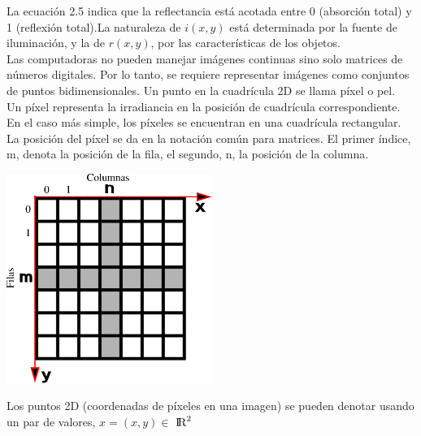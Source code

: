 La ecuación 2.5 indica que la reflectancia está acotada entre 0 (absorción total) y
1 (reflexión total).La naturaleza de $i(x,y)$ está determinada por la fuente de iluminación, y la de $r(x,y)$, por
las características de los objetos.\\
Las computadoras no pueden manejar imágenes continuas sino solo matrices de números digitales. Por lo tanto, se 
requiere representar imágenes como conjuntos de puntos bidimensionales. Un punto en la cuadrícula 2D se llama píxel o pel.\\
Un píxel representa la irradiancia en la posición de cuadrícula correspondiente. En el caso más simple, los píxeles se encuentran 
en una cuadrícula rectangular. La posición del píxel se da en la notación común para matrices.
El primer índice, m, denota la posición de la fila, el segundo, n, la posición de la columna.
\begin{center}
    \includegraphics[width=0.5\textwidth]{Capitulo2/Fig8.eps}
    \label{Fig8}
\end{center}
Los puntos 2D (coordenadas de píxeles en una imagen) se pueden denotar usando un par de valores, $x = (x,y) \in$ ${\rm I\!R}^2$